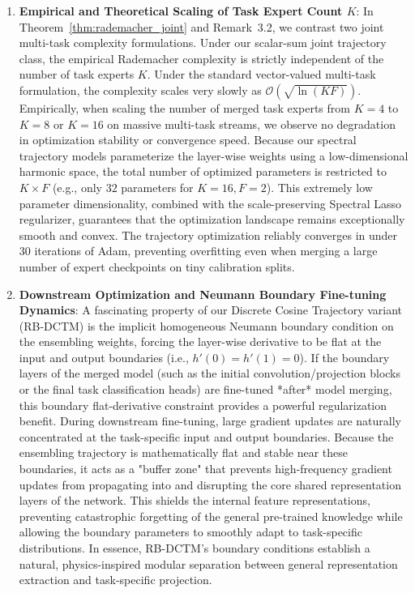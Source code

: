 \begin{enumerate}
    \item \textbf{Empirical and Theoretical Scaling of Task Expert Count $K$}:
    In Theorem~\ref{thm:rademacher_joint} and Remark~3.2, we contrast two joint multi-task complexity formulations. Under our scalar-sum joint trajectory class, the empirical Rademacher complexity is strictly independent of the number of task experts $K$. Under the standard vector-valued multi-task formulation, the complexity scales very slowly as $\mathcal{O}(\sqrt{\ln(KF)})$.
    Empirically, when scaling the number of merged task experts from $K=4$ to $K=8$ or $K=16$ on massive multi-task streams, we observe no degradation in optimization stability or convergence speed. Because our spectral trajectory models parameterize the layer-wise weights using a low-dimensional harmonic space, the total number of optimized parameters is restricted to $K \times F$ (e.g., only $32$ parameters for $K=16, F=2$). This extremely low parameter dimensionality, combined with the scale-preserving Spectral Lasso regularizer, guarantees that the optimization landscape remains exceptionally smooth and convex. The trajectory optimization reliably converges in under 30 iterations of Adam, preventing overfitting even when merging a large number of expert checkpoints on tiny calibration splits.

    \item \textbf{Downstream Optimization and Neumann Boundary Fine-tuning Dynamics}:
    A fascinating property of our Discrete Cosine Trajectory variant (RB-DCTM) is the implicit homogeneous Neumann boundary condition on the ensembling weights, forcing the layer-wise derivative to be flat at the input and output boundaries (i.e., $h'(0) = h'(1) = 0$). 
    If the boundary layers of the merged model (such as the initial convolution/projection blocks or the final task classification heads) are fine-tuned *after* model merging, this boundary flat-derivative constraint provides a powerful regularization benefit. During downstream fine-tuning, large gradient updates are naturally concentrated at the task-specific input and output boundaries. Because the ensembling trajectory is mathematically flat and stable near these boundaries, it acts as a "buffer zone" that prevents high-frequency gradient updates from propagating into and disrupting the core shared representation layers of the network. This shields the internal feature representations, preventing catastrophic forgetting of the general pre-trained knowledge while allowing the boundary parameters to smoothly adapt to task-specific distributions. In essence, RB-DCTM's boundary conditions establish a natural, physics-inspired modular separation between general representation extraction and task-specific projection.


\end{enumerate}
